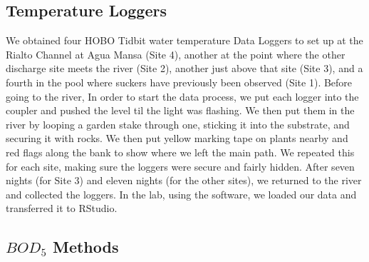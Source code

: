 \documentclass{article}\usepackage[]{graphicx}\usepackage[]{color}
\begin{document}
\subsection{Temperature Loggers}
We obtained four HOBO Tidbit water temperature Data Loggers to set up at the Rialto Channel at Agua Mansa (Site 4), another at the point where the other discharge site meets the river (Site 2), another just above that site (Site 3), and a fourth in the pool where suckers have previously been observed (Site 1). Before going to the river, In order to start the data process, we put each logger into the coupler and pushed the level til the light was flashing. We then put them in the river by looping a garden stake through one, sticking it into the substrate, and securing it with rocks. We then put yellow marking tape on plants nearby and red flags along the bank to show where we left the main path. We repeated this for each site, making sure the loggers were secure and fairly hidden. After seven nights (for Site 3) and eleven nights (for the other sites), we returned to the river and collected the loggers. In the lab, using the software, we loaded our data and transferred it to RStudio.

\subsection{$BOD_5$ Methods}
\end{document}
